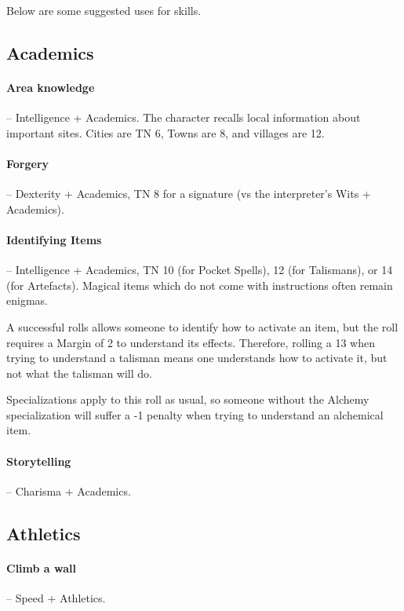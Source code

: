 \begin{multicols}{2}

\noindent
Below are some suggested uses for skills.

\subsection{Academics}

\paragraph{Area knowledge } -- Intelligence + Academics.
The character recalls local information about important sites.
Cities are TN 6, Towns are 8, and villages are 12.

\paragraph{Forgery} -- Dexterity + Academics, TN 8 for a signature (vs the interpreter's Wits + Academics).

\label{magicidentification}
\paragraph{Identifying Items} -- Intelligence + Academics, TN 10 (for Pocket Spells), 12 (for Talismans), or 14 (for Artefacts).
Magical items which do not come with instructions often remain enigmas.

A successful rolls allows someone to identify how to activate an item, but the roll requires a Margin of 2 to understand its effects.
Therefore, rolling a 13 when trying to understand a talisman means one understands how to activate it, but not what the talisman will do.

Specializations apply to this roll as usual, so someone without the Alchemy specialization will suffer a -1 penalty when trying to understand an alchemical item.

\paragraph{Storytelling} -- Charisma + Academics.

\subsection{Athletics}

\paragraph{Climb a wall} -- Speed + Athletics.


\end{multicols}
